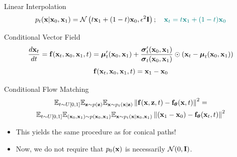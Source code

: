 \documentclass{beamer}
\begin{document}
\begin{frame}{Linear Interpolation}
	\vspace{-0.3cm}
	\[
		p_t(\mathbf{x} | \mathbf{x}_0, \mathbf{x}_1) = \mathcal{N}\left(t \mathbf{x}_1 + (1 - t) \mathbf{x}_0, \epsilon^2 \mathbf{I}\right); \quad {\color{teal}\mathbf{x}_t = t \mathbf{x}_1 + (1 - t) \mathbf{x}_0}
	\]
	\vspace{-0.5cm}
	\begin{block}{Conditional Vector Field}
		\vspace{-0.5cm}
		\[
			 \frac{d\mathbf{x}_t}{dt} = \mathbf{f}(\mathbf{x}_t, \mathbf{x}_0, \mathbf{x}_1, t) =  \boldsymbol{\mu}_t'(\mathbf{x}_0, \mathbf{x}_1) + \frac{\boldsymbol{\sigma}_t'(\mathbf{x}_0, \mathbf{x}_1)}{\boldsymbol{\sigma}_t(\mathbf{x}_0, \mathbf{x}_1)} \odot (\mathbf{x}_t - \boldsymbol{\mu}_t(\mathbf{x}_0, \mathbf{x}_1))
		\]
		\eqpause
		\vspace{-0.5cm}
		\[
			\mathbf{f}(\mathbf{x}_t, \mathbf{x}_0, \mathbf{x}_1, t) = \mathbf{x}_1 - \mathbf{x}_0
		\]
		\vspace{-0.7cm}
	\end{block}
	\eqpause
	\begin{block}{Conditional Flow Matching}
		\vspace{-0.7cm}
		\begin{multline*}
			\mathbb{E}_{t \sim U[0, 1]} \mathbb{E}_{\mathbf{z} \sim p(\mathbf{z})} \mathbb{E}_{\mathbf{x} \sim p_t(\mathbf{x} | \mathbf{z})}\left\| \mathbf{f}(\mathbf{x}, \mathbf{z}, t) - \mathbf{f}_{\boldsymbol{\theta}}(\mathbf{x}, t) \right\|^2 = \\
		 \mathbb{E}_{t \sim U[0, 1]} \mathbb{E}_{(\mathbf{x}_0, \mathbf{x}_1) \sim p(\mathbf{x}_0, \mathbf{x}_1)} \mathbb{E}_{\mathbf{x} \sim p_t(\mathbf{x} | \mathbf{x}_0, \mathbf{x}_1)} \left\| (\mathbf{x}_1 - \mathbf{x}_0) - \mathbf{f}_{\boldsymbol{\theta}}(\mathbf{x}_t, t) \right\|^2
		\end{multline*}
	\end{block}
	\eqpause
	\vspace{-0.3cm}
	\begin{itemize}
		\item This yields the same procedure as for conical paths!
		\item Now, we do not require that $p_0(\mathbf{x})$ is necessarily $\mathcal{N}(0, \mathbf{I})$.
	\end{itemize} 
\end{frame}
\end{document}
